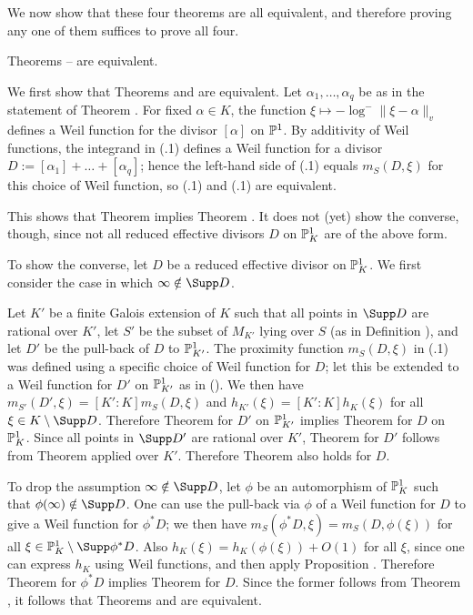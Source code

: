 We now show that these four theorems are all equivalent, and therefore
proving any one of them suffices to prove all four.

  Theorems -- are equivalent.
\endit

  We first show that Theorems  and  are equivalent.
Let $\alpha_1,\dots,\alpha_q$ be as in the statement of Theorem .
For fixed $\alpha\in K$, the function $\xi\mapsto -\log^{-}\|\xi-\alpha\|_v$
defines a Weil function for the divisor $[\alpha]$ on $\Bbb P^1$.  By additivity
of Weil functions, the integrand in (.1) defines a Weil function
for a divisor $D:=[\alpha_1]+\dots+[\alpha_q]$; hence the left-hand side
of (.1) equals $m_S(D,\xi)$ for this choice of Weil function,
so (.1) and (.1) are equivalent.

This shows that Theorem  implies Theorem .
It does not (yet) show the converse, though, since not all reduced effective
divisors $D$ on $\Bbb P^1_K$ are of the above form.

To show the converse, let $D$ be a reduced effective divisor on $\Bbb P^1_K$.
We first consider the case in which $\infty\notin\Supp D$.

Let $K'$ be a finite Galois extension of $K$ such that all points in $\Supp D$
are rational over $K'$, let $S'$ be the subset of $M_{K'}$ lying over $S$
(as in Definition ), and let $D'$ be the pull-back of $D$
to $\Bbb P^1_{K'}$.  The proximity function $m_S(D,\xi)$ in (.1)
was defined using a specific choice of Weil function for $D$;
let this be extended to a Weil function for $D'$ on $\Bbb P^1_{K'}$
as in ().  We then have $m_{S'}(D',\xi)=[K':K]m_S(D,\xi)$
and $h_{K'}(\xi)=[K':K]h_K(\xi)$ for all $\xi\in K\setminus\Supp D$.
Therefore Theorem  for $D'$ on $\Bbb P^1_{K'}$ implies
Theorem  for $D$ on $\Bbb P^1_K$.  Since all points in $\Supp D'$
are rational over $K'$, Theorem  for $D'$ follows from Theorem 
applied over $K'$.  Therefore Theorem  also holds for $D$.

To drop the assumption $\infty\notin\Supp D$, let $\phi$ be an automorphism
of $\Bbb P^1_K$ such that $\phi(\infty)\notin\Supp D$.
One can use the pull-back via $\phi$
of a Weil function for $D$ to give a Weil function for $\phi^{*}D$;
we then have $m_S(\phi^{*}D,\xi)=m_S(D,\phi(\xi))$ for all
$\xi\in\Bbb P^1_K\setminus\Supp\phi^{*}D$.
Also $h_K(\xi)=h_K(\phi(\xi))+O(1)$ for all $\xi$, since one can express
$h_K$ using Weil functions, and then apply Proposition .
Therefore Theorem  for $\phi^{*}D$ implies Theorem  for $D$.
Since the former follows from Theorem , it follows that
Theorems  and  are equivalent.

